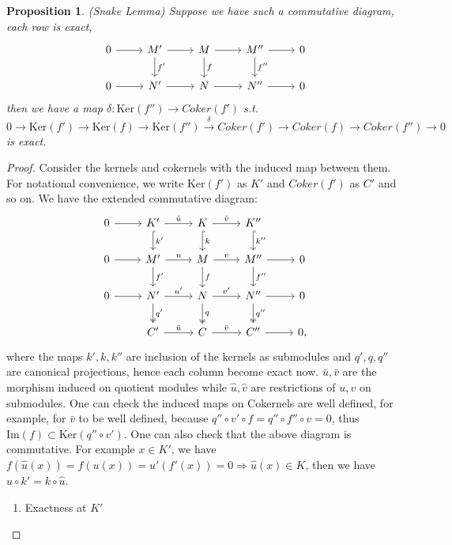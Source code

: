 \documentclass[11pt]{article}
\newtheorem{prop}[thm]{Proposition}
\newcommand{\rta}{\rightarrow}
\newcommand{\Lrta}{\Longrightarrow}
\newcommand{\lrta}{\longrightarrow}
\begin{document}
\begin{prop}(Snake Lemma)
Suppose we have such a commutative diagram, each row is exact, 
\[
\begin{tikzcd}
0\arrow[r]  & M'  \arrow[r]\arrow[d,"f'"] & M\arrow[r] \arrow[d,"f"] & M''\arrow[r] \arrow[d,"f''"] & 0 \\
0\arrow[r]  & N'  \arrow[r] & N\arrow[r] & N''\arrow[r]  & 0 
\end{tikzcd}
\]
then we have a map $\delta: \text{Ker}(f'')\lrta Coker(f')$ s.t.  
$$
0\lrta \text{Ker}(f')\lrta \text{Ker}(f)\rta \text{Ker}(f'')\overset{\delta}{\lrta}Coker(f')\lrta Coker(f)\lrta Coker(f'')\lrta 0 
$$
is exact.
\end{prop}

\begin{proof}
Consider the kernels and cokernels with the induced map between them. For notational convenience, we write $\text{Ker}(f')$ as $K'$ and $Coker(f')$ as $C'$ and so on. We have the extended commutative diagram:
\[
\begin{tikzcd}
0\arrow[r]  
& K'  \arrow[r,"\hat{u}"]\arrow[d,"k'",hook] 
& K\arrow[r,"\hat{v}"] \arrow[d,"k",hook] \arrow[ddd,phantom,""{coordinate, name=Z}] 
& K'' \arrow[d,"k''",hook]  
& \\
0\arrow[r]  & M'  \arrow[r,"u"]\arrow[d,"f'"] & M\arrow[r,"v"] \arrow[d,"f"] & M''\arrow[r] \arrow[d,"f''"] & 0 \\
0\arrow[r]  & N'  \arrow[r,"u'"] \arrow[d,"q'",two heads]& N\arrow[r,"v'"] \arrow[d,"q",two heads]& N''\arrow[r]\arrow[d,"q''",two heads]  & 0 \\
  & C'  \arrow[r,"\bar{u}"] & C\arrow[r,"\bar{v}"] & C''\arrow[r]  & 0,
\end{tikzcd}
\]
where the maps $k',k,k''$ are inclusion of the kernels as submodules and $q',q,q''$ are canonical projections, hence each column become exact now. $\bar{u}, \bar{v}$ are the morphism induced on quotient modules while $\hat{u}, \hat{v}$ are restrictions of $u,v$ on submodules. One can check the induced maps on Cokernels are well defined, for example, for $\bar{v}$ to be well defined, because $q''\circ v'\circ f=q''\circ f''\circ v =0$, thus $\text{Im}(f)\subset \text{Ker}(q''\circ v')$. One can also check that the above diagram is commutative. For example $x\in K'$, we have $f(\hat{u}(x))=f(u(x))=u'(f'(x))=0\Lrta \hat{u}(x)\in K$, then we have $u\circ k'=k\circ \hat{u}$. 
\begin{enumerate}
\item Exactness at $K'$\\

\end{enumerate}
\end{proof}
\end{document}
